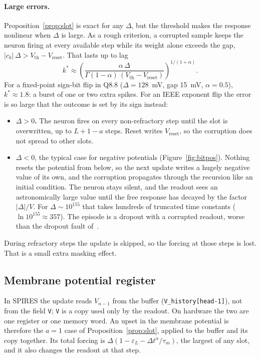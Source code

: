 \documentclass[11pt,a4paper]{article}
\newcommand{\dta}{\Delta t^{\alpha}}
\begin{document}
\paragraph{Large errors.} Proposition~\ref{prop:slot} is exact for any $\Delta$, but the threshold makes the response nonlinear when $\Delta$ is large. As a rough criterion, a corrupted sample keeps the neuron firing at every available step while its weight alone exceeds the gap, $|c_k|\,\Delta > V_{\mathrm{th}} - V_{\mathrm{reset}}$. That lasts up to lag
\begin{equation}
k^{*} \approx \left( \frac{\alpha\, \Delta}{\Gamma(1-\alpha)\,(V_{\mathrm{th}} - V_{\mathrm{reset}})} \right)^{1/(1+\alpha)}.
\end{equation}
For a fixed-point sign-bit flip in Q8.8 ($\Delta = 128$~mV, gap 15~mV, $\alpha = 0.5$), $k^{*} \approx 1.8$: a burst of one or two extra spikes. For an IEEE exponent flip the error is so large that the outcome is set by its sign instead:
\begin{itemize}
  \item \textbf{$\Delta > 0$.} The neuron fires on every non-refractory step until the slot is overwritten, up to $L+1-a$ steps. Reset writes $V_{\mathrm{reset}}$, so the corruption does not spread to other slots.
  \item \textbf{$\Delta < 0$}, the typical case for negative potentials (Figure~\ref{fig:bitpos}). Nothing resets the potential from below, so the next update writes a hugely negative value of its own, and the corruption propagates through the recursion like an initial condition. The neuron stays silent, and the readout sees an astronomically large value until the free response has decayed by the factor $|\Delta|/V$. For $\Delta \sim 10^{155}$ that takes hundreds of truncated time constants ($\ln 10^{155} \approx 357$). The episode is a dropout with a corrupted readout, worse than the dropout fault of~\cite{dropout2026}.
\end{itemize}
During refractory steps the update is skipped, so the forcing at those steps is lost. That is a small extra masking effect.

\subsection{Membrane potential register}

In SPIRES the update reads $V_{n-1}$ from the buffer (\texttt{V\_history[head-1]}), not from the field \texttt{V}; \texttt{V} is a copy used only by the readout. On hardware the two are one register or one memory word. An upset in the membrane potential is therefore the $a = 1$ case of Proposition~\ref{prop:slot}, applied to the buffer and its copy together. Its total forcing is $\Delta(1 - \varepsilon_L - \dta/\tau_m)$, the largest of any slot, and it also changes the readout at that step.
\end{document}
